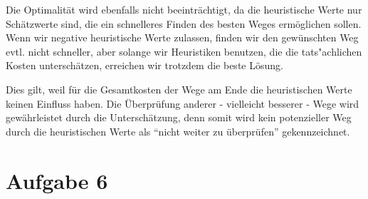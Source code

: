 \documentclass[a4paper]{article}
\begin{document}
Die Optimalit\"at wird ebenfalls nicht beeintr\"achtigt, da die heuristische Werte nur Sch\"atzwerte sind, die ein schnelleres Finden des besten Weges erm\"oglichen sollen. Wenn wir negative heuristische Werte zulassen, finden wir den gew\"unschten Weg evtl. nicht schneller, aber solange wir Heuristiken benutzen, die die tats"achlichen Kosten untersch\"atzen, erreichen wir trotzdem die beste L\"osung.

Dies gilt, weil f\"ur die Gesamtkosten der Wege am Ende die heuristischen Werte keinen Einfluss haben. Die \"Uberpr\"ufung anderer - vielleicht besserer - Wege wird gew\"ahrleistet durch die Untersch\"atzung, denn somit wird kein potenzieller Weg durch die heuristischen Werte als "`nicht weiter zu \"uberpr\"ufen"' gekennzeichnet.

\section*{Aufgabe 6}
\end{document}
